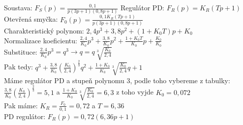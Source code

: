 \begin{center}
    Soustava: \(F_S(p)=\frac{0,1}{p(3p+1)(0,8p+1)}\) Regulátor PD: \(F_R(p)=K_R(Tp+1)\)\\
    Otevřená smyčka: \(F_0(p) = \frac{0,1K_R(Tp+1)}{p(3p+1)(0,8p+1)}\)\\
    Charakteristický polynom: \(2,4p^3+3,8p^2+(1+K_0T)p+K_0\)\\
    Normalizace koeficientu: \(\frac{2,4}{K_0}p^3+\frac{3,8}{K_0}p^2+\frac{1+K_0T}{K_0}p+\frac{K_0}{K_0}\)\\
    Substituce: \(\frac{2,4}{K_0}p^3 = q^3 \rightarrow q = q \sqrt[3]{\frac{K_0}{2,4}} \)\\
    Pak tedy: \(q^3 + \frac{3,8}{K_0}(\frac{K_0}{2,4})^{\frac{2}{3}}q^2+\frac{1+K_0}{K_0}\sqrt[3]{\frac{K_0}{2,4}}q+1\)\\
    Máme regulátor PD a stupeň polynomu 3, podle toho vybereme z tabulky:\\
    \(\frac{3,8}{K_0}(\frac{K_0}{2,4})^{\frac{2}{3}} = 5,1\) a \(\frac{1+K_0}{K_0}\sqrt[3]{\frac{K_0}{2,4}} = 6,3\) z toho vyjde \(K_0 = 0,072\)\\
    Pak máme: \(K_R = \frac{F_0}{0,1} = 0,72\) a \(T = 6,36\)\\
    PD regulátor: \(F_R(p) = 0,72(6,36p+1)\)
\end{center}

